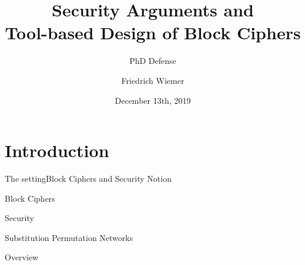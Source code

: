 \documentclass[%
    10pt,
    professionalfont,
    aspectratio=169,
]{beamer}
\title{Security Arguments and\\ Tool-based Design of Block Ciphers}
\subtitle{PhD Defense}
\author{Friedrich Wiemer}
\institute{%
    Arbeitsgruppe Symmetrische Kryptographie, Horst-Görtz-Institut für IT Sicherheit, Ruhr-Universität Bochum
}
\date[December 13th, 2019]{\small{}December 13th, 2019}
\begin{document}
\begin{frame}[plain]
    \titlepage{}
\end{frame}

\section{Introduction}
\begin{frame}{The setting}{Block Ciphers and Security Notion}
\end{frame}

\begin{frame}{Block Ciphers}
\end{frame}

\begin{frame}{Security}
\end{frame}

\begin{frame}{Substitution Permutation Networks}
\end{frame}

\begin{frame}{Overview}
    \tableofcontents{}
\end{frame}
\end{document}
